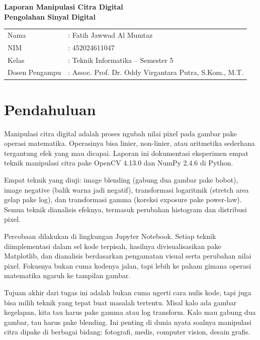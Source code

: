 \documentclass[11pt,a4paper]{article}
\begin{document}
\begin{center}
    \textbf{\Large Laporan Manipulasi Citra Digital}\\[4pt]
    \textbf{Pengolahan Sinyal Digital}\\[10pt]
    \begin{tabular}{ll}
        Nama           & : Fatih Jawwad Al Mumtaz \\
        NIM            & : 452024611047 \\
        Kelas          & : Teknik Informatika -- Semester 5 \\
        Dosen Pengampu & : Assoc. Prof. Dr. Oddy Virgantara Putra, S.Kom., M.T. \\
    \end{tabular}
\end{center}

\vspace{0.3cm}

\section{Pendahuluan}

Manipulasi citra digital adalah proses ngubah nilai pixel pada gambar pake operasi matematika. Operasinya bisa linier, non-linier, atau aritmetika sederhana tergantung efek yang mau dicapai. Laporan ini dokumentasi eksperimen empat teknik manipulasi citra pake OpenCV 4.13.0 dan NumPy 2.4.6 di Python.

Empat teknik yang diuji: image blending (gabung dua gambar pake bobot), image negative (balik warna jadi negatif), transformasi logaritmik (stretch area gelap pake log), dan transformasi gamma (koreksi exposure pake power-law). Semua teknik dianalisis efeknya, termasuk perubahan histogram dan distribusi pixel.

Percobaan dilakukan di lingkungan Jupyter Notebook. Setiap teknik diimplementasi dalam sel kode terpisah, hasilnya divisualisasikan pake Matplotlib, dan dianalisis berdasarkan pengamatan visual serta perubahan nilai pixel. Fokusnya bukan cuma kodenya jalan, tapi lebih ke paham gimana operasi matematika ngaruh ke tampilan gambar.

Tujuan akhir dari tugas ini adalah bukan cuma ngerti cara nulis kode, tapi juga bisa milih teknik yang tepat buat masalah tertentu. Misal kalo ada gambar kegelapan, kita tau harus pake gamma atau log transform. Kalo mau gabung dua gambar, tau harus pake blending. Ini penting di dunia nyata soalnya manipulasi citra dipake di berbagai bidang: fotografi, medis, computer vision, desain grafis.
\end{document}
